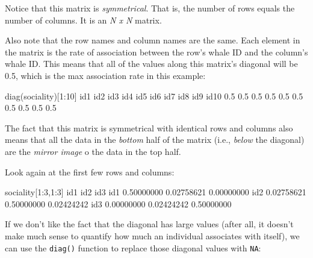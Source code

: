 \documentclass[
]{book}
\newenvironment{Shaded}{\begin{snugshade}}{\end{snugshade}}
\newcommand{\DecValTok}[1]{\textcolor[rgb]{0.00,0.00,0.81}{#1}}
\newcommand{\FloatTok}[1]{\textcolor[rgb]{0.00,0.00,0.81}{#1}}
\newcommand{\FunctionTok}[1]{\textcolor[rgb]{0.00,0.00,0.00}{#1}}
\newcommand{\NormalTok}[1]{#1}
\newcommand{\SpecialCharTok}[1]{\textcolor[rgb]{0.00,0.00,0.00}{#1}}
\begin{document}
Notice that this matrix is \emph{symmetrical}. That is, the number of rows equals the number of columns. It is an \emph{N x N} matrix.

Also note that the row names and column names are the same. Each element in the matrix is the rate of association between the row's whale ID and the column's whale ID. This means that all of the values along this matrix's diagonal will be 0.5, which is the max association rate in this example:

\begin{Shaded}
\begin{Highlighting}[]
\FunctionTok{diag}\NormalTok{(sociality)[}\DecValTok{1}\SpecialCharTok{:}\DecValTok{10}\NormalTok{]}
\NormalTok{ id1  id2  id3  id4  id5  id6  id7  id8  id9 id10 }
 \FloatTok{0.5}  \FloatTok{0.5}  \FloatTok{0.5}  \FloatTok{0.5}  \FloatTok{0.5}  \FloatTok{0.5}  \FloatTok{0.5}  \FloatTok{0.5}  \FloatTok{0.5}  \FloatTok{0.5} 
\end{Highlighting}
\end{Shaded}

The fact that this matrix is symmetrical with identical rows and columns also means that all the data in the \emph{bottom} half of the matrix (i.e., \emph{below} the diagonal) are the \emph{mirror image} o the data in the top half.

Look again at the first few rows and columns:

\begin{Shaded}
\begin{Highlighting}[]
\NormalTok{sociality[}\DecValTok{1}\SpecialCharTok{:}\DecValTok{3}\NormalTok{,}\DecValTok{1}\SpecialCharTok{:}\DecValTok{3}\NormalTok{]}
\NormalTok{           id1        id2        id3}
\NormalTok{id1 }\FloatTok{0.50000000} \FloatTok{0.02758621} \FloatTok{0.00000000}
\NormalTok{id2 }\FloatTok{0.02758621} \FloatTok{0.50000000} \FloatTok{0.02424242}
\NormalTok{id3 }\FloatTok{0.00000000} \FloatTok{0.02424242} \FloatTok{0.50000000}
\end{Highlighting}
\end{Shaded}

If we don't like the fact that the diagonal has large values (after all, it doesn't make much sense to quantify how much an individual associates with itself), we can use the \texttt{diag()} function to replace those diagonal values with \texttt{NA}:
\end{document}
